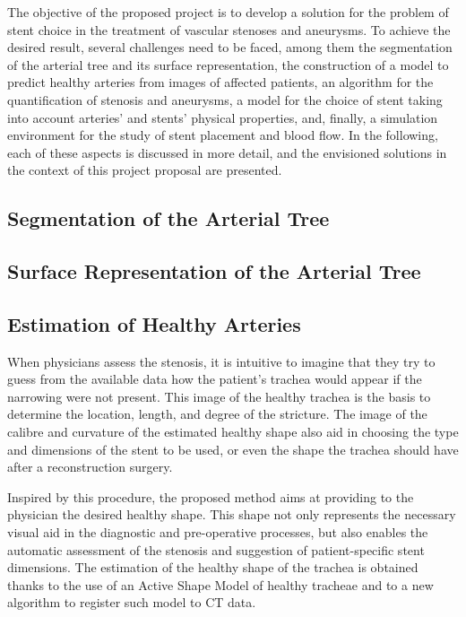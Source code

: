\documentclass[a4paper]{article}
\begin{document}
The objective of the proposed project is to develop a solution for the problem of stent choice in the treatment of vascular stenoses and aneurysms. To achieve the desired result, several challenges need to be faced, among them the segmentation of the arterial tree and its surface representation, the construction of a model to predict healthy arteries from images of affected patients, an algorithm for the quantification of stenosis and aneurysms, a model for the choice of stent taking into account arteries' and stents' physical properties, and, finally, a simulation environment for the study of stent placement and blood flow. In the following, each of these aspects is discussed in more detail, and the envisioned solutions in the context of this project proposal are presented.

\subsection{Segmentation of the Arterial Tree}

\subsection{Surface Representation of the Arterial Tree}

\subsection{Estimation of Healthy Arteries}

When physicians
assess the stenosis, it is intuitive to imagine that they try to guess
from the available data how the patient’s trachea would appear if the narrowing
were not present. This image of the healthy trachea is the basis to
determine the location, length, and degree of the stricture. The image of the calibre and curvature of the estimated healthy shape also aid in choosing
the type and dimensions of the stent to be used, or even the shape the
trachea should have after a reconstruction surgery.

Inspired by this procedure, the proposed method aims at providing to
the physician the desired healthy shape. This shape not only represents
the necessary visual aid in the diagnostic and pre-operative processes, but
also enables the automatic assessment of the stenosis and suggestion of
patient-specific stent dimensions. The estimation of the healthy shape of
the trachea is obtained thanks to the use of an Active Shape Model of
healthy tracheae and to a new algorithm to register such model to CT
data.
\end{document}
